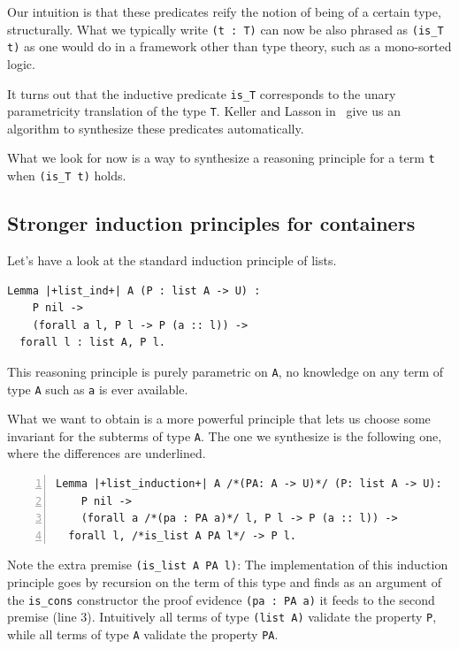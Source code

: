 \documentclass[sigplan,10pt,review]{acmart}\settopmatter{printfolios=true,printccs=false,printacmref=false}
\begin{document}
Our intuition is that these predicates reify the notion of being
of a certain type, structurally. What we typically write \lstinline+(t : T)+
can now be also phrased as \lstinline+(is_T t)+ as one would do in a
framework other than type theory, such as a mono-sorted logic.

It turns out that the inductive predicate \lstinline+is_T+ corresponds
to the unary parametricity translation of the type \lstinline+T+.
Keller and Lasson in~\cite{keller:hal-00730913} give us an
algorithm to synthesize these predicates automatically.

What we look for now is a way to synthesize
a reasoning principle for a term \lstinline+t+ when 
\lstinline+(is_T t)+ holds.

\subsection{Stronger induction principles for containers} %

Let's have a look at the standard induction principle of lists.

\begin{minipage}{\textwidth}\begin{lstlisting}
Lemma |+list_ind+| A (P : list A -> U) :
    P nil ->
    (forall a l, P l -> P (a :: l)) ->
  forall l : list A, P l.
\end{lstlisting}\end{minipage}

\noindent
This reasoning principle is purely parametric on \lstinline+A+, no
knowledge on any term of type \lstinline+A+ such as \lstinline+a+ is
ever available.

What we want to obtain is a more powerful principle that lets us choose
some invariant for the subterms of type \lstinline+A+. The one we
synthesize is the following one, where the differences are underlined.

\begin{minipage}{\textwidth}\begin{lstlisting}[numbers=left]
Lemma |+list_induction+| A /*(PA: A -> U)*/ (P: list A -> U):
    P nil ->
    (forall a /*(pa : PA a)*/ l, P l -> P (a :: l)) ->
  forall l, /*is_list A PA l*/ -> P l.
\end{lstlisting}\end{minipage}

\noindent
Note the extra premise \lstinline+(is_list A PA l)+: The
implementation of this induction principle
goes by recursion on the term of this type and finds
as an argument of the \lstinline+is_cons+ constructor
the proof evidence \lstinline+(pa : PA a)+ it feeds to the second premise
(line 3). Intuitively all terms of type \lstinline+(list A)+
validate the property \lstinline+P+, while all terms of type
\lstinline+A+ validate the property \lstinline+PA+.
\end{document}
